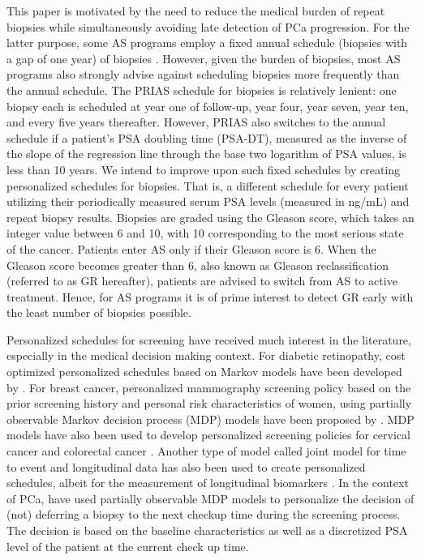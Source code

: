 This paper is motivated by the need to reduce the medical burden of repeat biopsies while simultaneously avoiding late detection of PCa progression. For the latter purpose, some AS programs employ a fixed annual schedule (biopsies with a gap of one year) of biopsies \citep{tosoian2011active,welty2015extended}. However, given the burden of biopsies, most AS programs also strongly advise against scheduling biopsies more frequently than the annual schedule. The PRIAS schedule for biopsies is relatively lenient: one biopsy each is scheduled at year one of follow-up, year four, year seven, year ten, and every five years thereafter. However, PRIAS also switches to the annual schedule if a patient's PSA doubling time (PSA-DT), measured as the inverse of the slope of the regression line through the base two logarithm of PSA values, is less than 10 years. We intend to improve upon such fixed schedules by creating personalized schedules for biopsies. That is, a different schedule for every patient utilizing their periodically measured serum PSA levels (measured in ng/mL) and repeat biopsy results. Biopsies are graded using the Gleason score, which takes an integer value between 6 and 10, with 10 corresponding to the most serious state of the cancer. Patients enter AS only if their Gleason score is 6. When the Gleason score becomes greater than 6, also known as Gleason reclassification (referred to as GR hereafter), patients are advised to switch from AS to active treatment. Hence, for AS programs it is of prime interest to detect GR early with the least number of biopsies possible.

Personalized schedules for screening have received much interest in the literature, especially in the medical decision making context. For diabetic retinopathy, cost optimized personalized schedules based on Markov models have been developed by \citet{bebu2017OptimalScreening}. For breast cancer, personalized mammography screening policy based on the prior screening history and personal risk characteristics of women, using partially observable Markov decision process (MDP) models have been proposed by \citet*{ayer2012or}. MDP models have also been used to develop personalized screening policies for cervical cancer \citep*{akhavan2017markov} and colorectal cancer \citep*{erenay2014optimizing}. Another type of model called joint model for time to event and longitudinal data \citep{tsiatis2004joint,rizopoulos2012joint} has also been used to create personalized schedules, albeit for the measurement of longitudinal biomarkers \citep{drizopoulosPersScreening}. In the context of PCa, \citet{zhang2012optimization} have used partially observable MDP models to personalize the decision of (not) deferring a biopsy to the next checkup time during the screening process. The decision is based on the baseline characteristics as well as a discretized PSA level of the patient at the current check up time.

